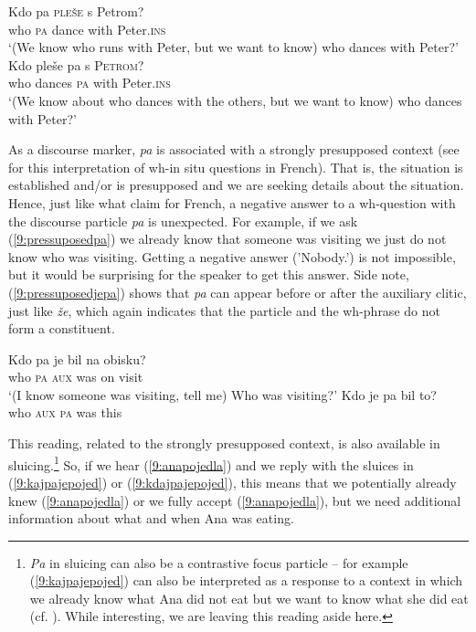 \documentclass[output=paper,
modfonts,
newtxmath,
hidelinks
]{langscibook}
\begin{document}
\begin{exe}
\ex  \label{9:topicfocuspa}
\begin{xlist}
\ex \gll	Kdo pa \textsc{pleše} s Petrom?\\
		who \textsc{pa} dance with Peter.\textsc{ins}\\
\trans `(We know who runs with Peter, but we want to know) who dances with Peter?'
\ex \gll	Kdo pleše pa s \textsc{Petrom}?\\
		who dances \textsc{pa} with Peter.\textsc{ins}\\
\trans `(We know about who dances with the others, but we want to know) who dances with Peter?'
\end{xlist}
\end{exe}

\noindent As a discourse marker, \textit{pa} is associated with a strongly presupposed context (see \citealt{chengrooryck2000} for this interpretation of wh-in situ questions in French). That is, the situation is established and/or is presupposed and we are seeking details about the situation. Hence, just like what \cite{chengrooryck2000} claim for French, a negative answer to a wh-question with the discourse particle \textit{pa} is unexpected. For example, if we ask (\ref{9:pressuposedpa}) we already know that someone was visiting we just do not know who was visiting. Getting a negative answer ('Nobody.') is not impossible, but it would be surprising for the speaker to get this answer. Side note, (\ref{9:pressuposedjepa}) shows that \textit{pa} can appear before or after the auxiliary clitic, just like \textit{že}, which again indicates that the particle and the wh-phrase do not form a constituent. 

\begin{exe}
\ex \begin{xlist}
\ex \label{9:pressuposedpa}
\gll Kdo pa je bil na obisku?\\
	who \textsc{pa} \textsc{aux} was on visit\\
\trans `(I know someone was visiting, tell me) Who was visiting?'
\ex \label{9:pressuposedjepa} 
\gll Kdo je pa bil to?\\
who  \textsc{aux}  \textsc{pa} was this\\
\end{xlist}
\end{exe}

\noindent This reading, related to the strongly presupposed context, is also available in sluicing.\footnote{\textit{Pa} in sluicing can also be a contrastive focus particle -- for example (\ref{9:kajpajepojed}) can also be interpreted as a response to a context in which we already know what Ana did not eat but we want to know what she did eat (cf. \citealt{marusicetal2015}). While interesting, we are leaving this reading aside here.} So, if we hear (\ref{9:anapojedla}) and we reply with the sluices in (\ref{9:kajpajepojed}) or (\ref{9:kdajpajepojed}), this means that we potentially already knew (\ref{9:anapojedla}) or we fully accept (\ref{9:anapojedla}), but we need additional information about what and when Ana was eating. 
\end{document}
